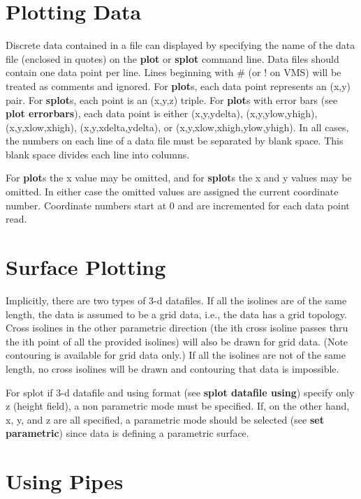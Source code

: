 \section{Plotting Data}
Discrete data contained in a file can displayed by specifying the
name of the data file (enclosed in quotes) on the {\bf plot} or {\bf splot}
command line. Data files should contain one data point per line.
Lines beginning with \# (or ! on VMS) will be treated as comments
and ignored. For {\bf plot}s, each data point represents an (x,y)
pair. For {\bf splot}s, each point is an (x,y,z) triple. For {\bf plot}s with
error bars (see {\bf plot errorbars}), each data point is either
(x,y,ydelta), (x,y,ylow,yhigh), (x,y,xlow,xhigh), (x,y,xdelta,ydelta), or
(x,y,xlow,xhigh,ylow,yhigh). In all cases, the numbers on each
line of a data file must be separated by blank space. This blank
space divides each line into columns.

For {\bf plot}s the x value may be omitted, and for {\bf splot}s the x
and y values may be omitted. In either case the omitted values are
assigned the current coordinate number. Coordinate numbers start at 0
and are incremented for each data point read.

\section{Surface Plotting}
Implicitly, there are two types of 3-d datafiles. If all the isolines
are of the same length, the data is assumed to be a grid data, i.e.,
the data has a grid topology. Cross isolines in the other parametric
direction (the ith cross isoline passes thru the ith point of all the
provided isolines) will also be drawn for grid data. (Note contouring
is available for grid data only.) If all the isolines are not of the
same length, no cross isolines will be drawn and contouring that data
is impossible.

For splot if 3-d datafile and using format (see {\bf splot datafile using})
specify only z (height field), a non parametric mode must be specified.
If, on the other hand, x, y, and z are all specified, a parametric
mode should be selected (see {\bf set parametric}) since data is defining a
parametric surface.


\section{Using Pipes}

